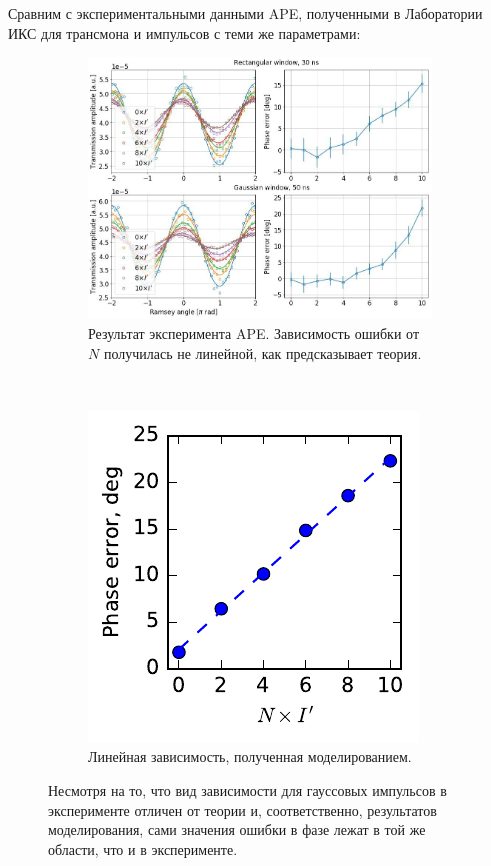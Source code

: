 \documentclass[12pt, twoside]{report}
\numberwithin{equation}{section}
\numberwithin{figure}{section}
\begin{document}
Сравним с экспериментальными данными APE, полученными в Лаборатории ИКС для трансмона и импульсов с теми же параметрами:
\begin{figure}[!h]
\begingroup
\captionsetup[subfigure]{width=0.95\textwidth, justification=normal}
\centering
\begin{subfigure}[t]{0.69\linewidth}
\centering
\includegraphics[width = .95\textwidth]{Pictures2/APE_experiment}
\caption{ Результат эксперимента APE. Зависимость ошибки от $N$ получилась не линейной, как предсказывает теория. }
\label{fig:ape-experiment}
\end{subfigure}~
\begin{subfigure}[t]{0.29\linewidth}
\centering
\includegraphics[width = .95\textwidth]{Pictures2/APE_error_gaussian}
\caption{ Линейная зависимость, полученная моделированием.  }
\label{fig:ape-result-2}
\end{subfigure}
\endgroup
\caption{ Несмотря на то, что вид зависимости для гауссовых импульсов в эксперименте отличен от теории и, соответственно, результатов моделирования, сами значения ошибки в фазе лежат в той же области, что и в эксперименте. }
\label{fig:ape-results-exp}
\end{figure} 
\end{document}

